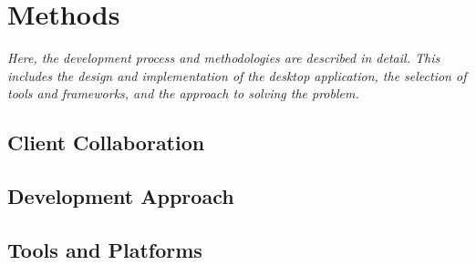 \chapter{Methods}

\begin{center}
    \textit{Here, the development process and methodologies are described in detail. This includes the design and implementation of the desktop application, the selection of tools and frameworks, and the approach to solving the problem.}
\end{center}

\section{Client Collaboration}



\section{Development Approach}










\section{Tools and Platforms}



